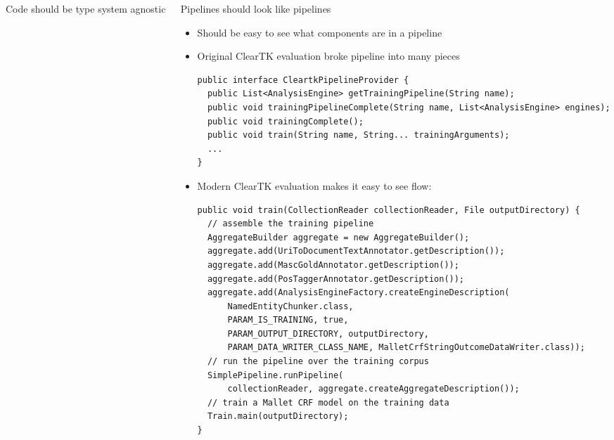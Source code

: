\documentclass[final]{beamer}
\begin{document}
\begin{frame}[fragile]
\begin{columns}[t]
\begin{column}{.45\linewidth}
\begin{block}{Code should be type system agnostic}
    \end{block}


  \end{column}


  \begin{column}{.45\linewidth}
    


    \begin{block}{Pipelines should look like pipelines}
        \begin{itemize}
            \item Should be easy to see what components are in a pipeline
            \item Original ClearTK evaluation broke pipeline into many pieces
\begin{lstlisting}
public interface CleartkPipelineProvider {
  public List<AnalysisEngine> getTrainingPipeline(String name);
  public void trainingPipelineComplete(String name, List<AnalysisEngine> engines);
  public void trainingComplete();
  public void train(String name, String... trainingArguments);
  ...
}
\end{lstlisting}
            \item Modern ClearTK evaluation makes it easy to see flow:
\begin{lstlisting}
public void train(CollectionReader collectionReader, File outputDirectory) {
  // assemble the training pipeline
  AggregateBuilder aggregate = new AggregateBuilder();
  aggregate.add(UriToDocumentTextAnnotator.getDescription());
  aggregate.add(MascGoldAnnotator.getDescription());
  aggregate.add(PosTaggerAnnotator.getDescription());
  aggregate.add(AnalysisEngineFactory.createEngineDescription(
      NamedEntityChunker.class,
      PARAM_IS_TRAINING, true,
      PARAM_OUTPUT_DIRECTORY, outputDirectory,
      PARAM_DATA_WRITER_CLASS_NAME, MalletCrfStringOutcomeDataWriter.class));
  // run the pipeline over the training corpus
  SimplePipeline.runPipeline(
      collectionReader, aggregate.createAggregateDescription());
  // train a Mallet CRF model on the training data
  Train.main(outputDirectory);
}
\end{lstlisting}
    \end{itemize}

    \end{block}






\end{column}
\end{columns}
\end{frame}
\end{document}
